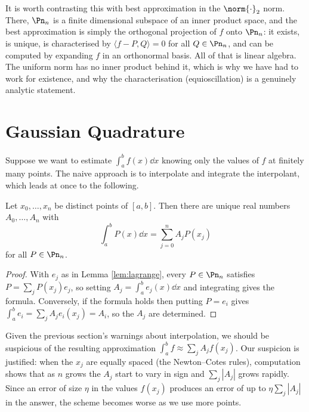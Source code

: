 \begin{remark}
	It is worth contrasting this with best approximation in the $\norm{\cdot}_2$ norm. There, $\Pn_n$ is a finite dimensional subspace of an inner product space, and the best approximation is simply the orthogonal projection of $f$ onto $\Pn_n$: it exists, is unique, is characterised by $\langle f - P, Q\rangle = 0$ for all $Q\in\Pn_n$, and can be computed by expanding $f$ in an orthonormal basis. All of that is linear algebra. The uniform norm has no inner product behind it, which is why we have had to work for existence, and why the characterisation (equioscillation) is a genuinely analytic statement.
\end{remark}

\section{Gaussian Quadrature}

Suppose we want to estimate $\int_a^b f(x)\dd x$ knowing only the values of $f$ at finitely many points. The naive approach is to interpolate and integrate the interpolant, which leads at once to the following.

\begin{lemma}\label{lem:quad-weights}
	Let $x_0,\ldots,x_n$ be distinct points of $[a,b]$. Then there are unique real numbers $A_0,\ldots,A_n$ with
	$$\int_a^b P(x)\dd x = \sum_{j=0}^n A_jP(x_j)$$
	for all $P \in\Pn_n$.
\end{lemma}

\begin{proof}
	With $e_j$ as in Lemma \ref{lem:lagrange}, every $P\in\Pn_n$ satisfies $P = \sum_j P(x_j)e_j$, so setting $A_j = \int_a^b e_j(x)\dd x$ and integrating gives the formula. Conversely, if the formula holds then putting $P = e_i$ gives $\int_a^b e_i = \sum_j A_j e_i(x_j) = A_i$, so the $A_j$ are determined.
\end{proof}

Given the previous section's warnings about interpolation, we should be suspicious of the resulting approximation $\int_a^b f \approx \sum_j A_jf(x_j)$. Our suspicion is justified: when the $x_j$ are equally spaced (the Newton--Cotes rules), computation shows that as $n$ grows the $A_j$ start to vary in sign and $\sum_j|A_j|$ grows rapidly. Since an error of size $\eta$ in the values $f(x_j)$ produces an error of up to $\eta\sum_j|A_j|$ in the answer, the scheme becomes worse as we use more points.

